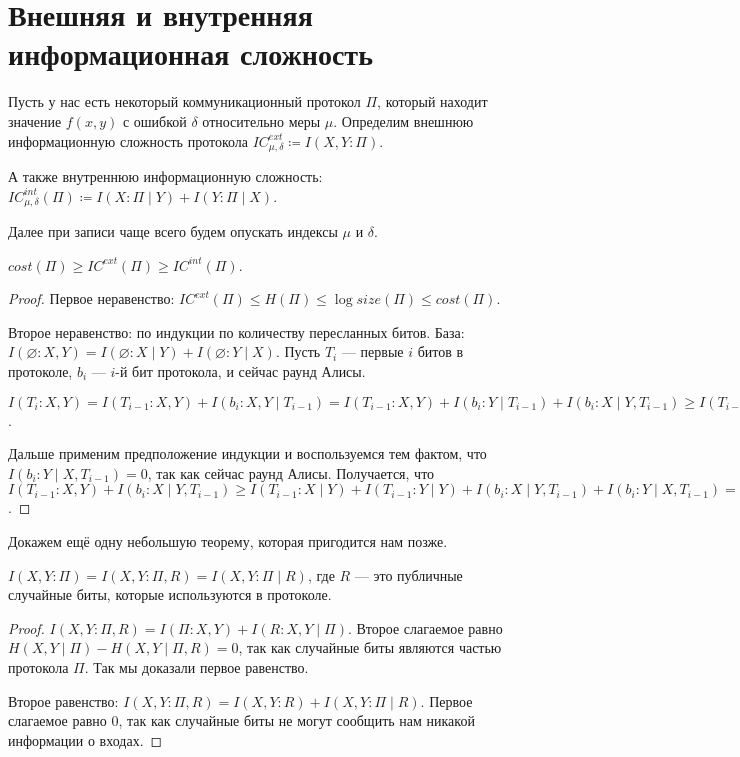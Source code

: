 \section{Внешняя и внутренняя информационная сложность}

Пусть у нас есть некоторый коммуникационный протокол $\Pi$, который находит значение $f(x, y)$ с ошибкой $\delta$ относительно меры $\mu$. Определим внешнюю информационную сложность протокола $IC^{ext}_{\mu, \delta} \coloneqq I(X, Y : \Pi)$.

А также внутреннюю информационную сложность: $IC^{int}_{\mu, \delta}(\Pi) \coloneqq I(X : \Pi \mid Y) + I(Y : \Pi \mid X)$.

Далее при записи чаще всего будем опускать индексы $\mu$ и $\delta$.

\begin{lemma}
$cost(\Pi) \geq IC^{ext}(\Pi) \geq IC^{int}(\Pi)$.
\end{lemma}

\begin{proof}
Первое неравенство: $IC^{ext}(\Pi) \leq H(\Pi) \leq \log{size(\Pi)} \leq cost(\Pi)$.

Второе неравенство: по индукции по количеству пересланных битов. База: $I(\varnothing : X, Y) = I(\varnothing : X \mid Y) + I(\varnothing : Y \mid X)$. Пусть $T_i$ --- первые $i$ битов в протоколе, $b_i$ --- $i$-й бит протокола, и сейчас раунд Алисы.

$I(T_i : X, Y) = I(T_{i - 1} : X, Y) + I(b_i : X, Y \mid T_{i - 1}) = I(T_{i - 1} : X, Y) + I(b_i : Y \mid T_{i - 1}) + I(b_i : X \mid Y, T_{i - 1}) \geq I(T_{i - 1} : X, Y) + I(b_i : X \mid Y, T_{i - 1})$.

Дальше применим предположение индукции и воспользуемся тем фактом, что $I(b_i : Y \mid X, T_{i - 1}) = 0$, так как сейчас раунд Алисы. Получается, что $I(T_{i - 1} : X, Y) + I(b_i : X \mid Y, T_{i - 1}) \geq I(T_{i - 1} : X \mid Y) + I(T_{i - 1} : Y \mid Y) + I(b_i : X \mid Y, T_{i - 1}) + I(b_i : Y \mid X, T_{i - 1}) = I(T_i : X \mid Y) + I(T_i : Y \mid X)$.
\end{proof}

Докажем ещё одну небольшую теорему, которая пригодится нам позже.

\begin{theorem}
$I(X, Y : \Pi) = I(X, Y : \Pi, R) = I(X, Y : \Pi \mid R)$, где $R$ --- это публичные случайные биты, которые используются в протоколе.
\end{theorem}

\begin{proof}
$I(X, Y : \Pi, R) = I(\Pi : X, Y) + I(R : X, Y \mid \Pi)$. Второе слагаемое равно $H(X, Y \mid \Pi) - H(X, Y \mid \Pi, R) = 0$, так как случайные биты являются частью протокола $\Pi$. Так мы доказали первое равенство.

Второе равенство: $I(X, Y : \Pi, R) = I(X, Y : R) + I(X, Y : \Pi \mid R)$. Первое слагаемое равно $0$, так как случайные биты не могут сообщить нам никакой информации о входах.
\end{proof}


